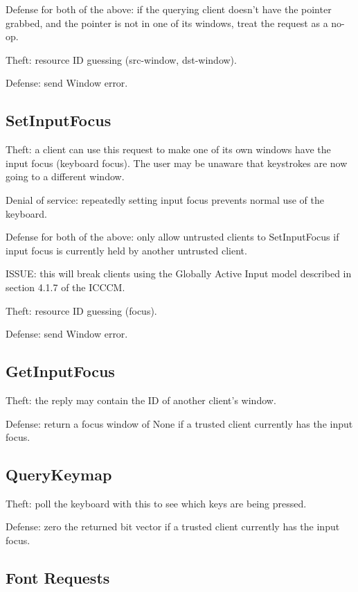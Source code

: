 \documentclass{article}
\begin{document}
Defense for both of the above: if the querying client doesn't have the
pointer grabbed, and the pointer is not in one of its windows, treat
the request as a no-op.

Theft: resource ID guessing (src-window, dst-window).

Defense: send Window error.



\subsection{SetInputFocus}

Theft: a client can use this request to make one of its own windows
have the input focus (keyboard focus).  The user may be unaware that
keystrokes are now going to a different window.

Denial of service: repeatedly setting input focus prevents normal use
of the keyboard.

Defense for both of the above: only allow untrusted clients to
SetInputFocus if input focus is currently held by another untrusted
client.

ISSUE: this will break clients using the Globally Active Input model
described in section 4.1.7 of the ICCCM.

Theft: resource ID guessing (focus).

Defense: send Window error.



\subsection{GetInputFocus}

Theft: the reply may contain the ID of another client's window.

Defense: return a focus window of None if a trusted client currently
has the input focus.



\subsection{QueryKeymap}

Theft: poll the keyboard with this to see which keys are being pressed.

Defense: zero the returned bit vector if a trusted client currently
has the input focus.



\subsection{Font Requests}
\end{document}
